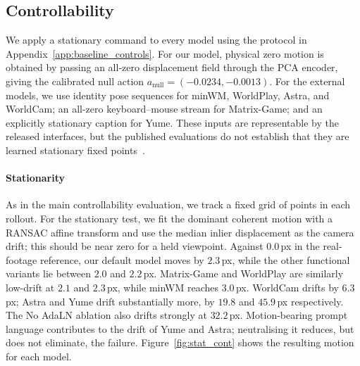 \documentclass[letterpaper]{article} %
\begin{document}
\subsection{Controllability}
\label{app:stationary_controllability}

We apply a stationary command to every model using the protocol in
Appendix~\ref{app:baseline_controls}. For our model, physical zero motion is
obtained by passing an all-zero displacement field through the PCA encoder,
giving the calibrated null action
$a_{\mathrm{null}}=(-0.0234,-0.0013)$. For the external models, we use identity
pose sequences for minWM, WorldPlay, Astra, and WorldCam; an all-zero
keyboard--mouse stream for Matrix-Game; and an explicitly stationary caption
for Yume. These inputs are representable by the released interfaces, but the
published evaluations do not establish that they are learned stationary fixed
points~\cite{minwm,worldcam,astra,matrixgame2,hyworldplay,yume}.

\paragraph{Stationarity}
As in the main controllability evaluation, we track a fixed grid of points in
each rollout. For the stationary test, we fit the dominant coherent motion with
a RANSAC affine transform and use the median inlier displacement as the camera
drift; this should be near zero for a held viewpoint. Against $0.0$\,px in the
real-footage reference, our default model moves by $2.3$\,px, while the other
functional variants lie between $2.0$ and $2.2$\,px. Matrix-Game and WorldPlay
are similarly low-drift at $2.1$ and $2.3$\,px, while minWM reaches $3.0$\,px.
WorldCam drifts by $6.3$\,px; Astra and Yume drift substantially more, by
$19.8$ and $45.9$\,px respectively. The No AdaLN ablation also drifts strongly
at $32.2$\,px. Motion-bearing prompt language contributes to the drift of Yume
and Astra; neutralising it reduces, but does not eliminate, the failure.
Figure~\ref{fig:stat_cont} shows the resulting motion for each model.
\end{document}
